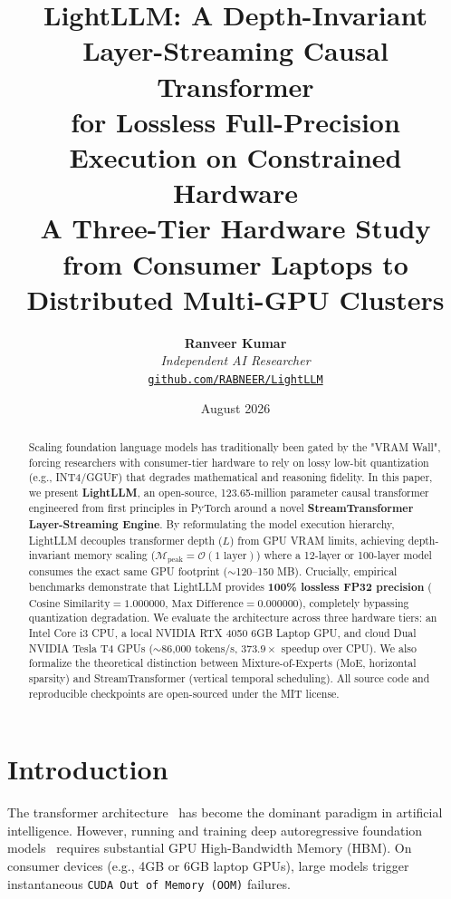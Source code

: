 \documentclass[10pt,twocolumn,a4paper]{article}
\title{%
    \vspace{-1.0cm}
    \textbf{\Large LightLLM: A Depth-Invariant Layer-Streaming Causal Transformer\\
    for Lossless Full-Precision Execution on Constrained Hardware}\\[4pt]
    \large A Three-Tier Hardware Study from Consumer Laptops to Distributed Multi-GPU Clusters
}
\author{%
    \textbf{Ranveer Kumar}\\[2pt]
    \textit{Independent AI Researcher}\\
    \href{https://github.com/RABNEER/LightLLM}{\texttt{github.com/RABNEER/LightLLM}}
}
\date{August 2026}
\begin{document}
\maketitle

\begin{abstract}
\noindent Scaling foundation language models has traditionally been gated by the "VRAM Wall", forcing researchers with consumer-tier hardware to rely on lossy low-bit quantization (e.g., INT4/GGUF) that degrades mathematical and reasoning fidelity. In this paper, we present \textbf{LightLLM}, an open-source, 123.65-million parameter causal transformer engineered from first principles in PyTorch around a novel \textbf{StreamTransformer Layer-Streaming Engine}. By reformulating the model execution hierarchy, LightLLM decouples transformer depth ($L$) from GPU VRAM limits, achieving depth-invariant memory scaling ($\mathcal{M}_{\text{peak}} = \mathcal{O}(1\text{ layer})$) where a 12-layer or 100-layer model consumes the exact same GPU footprint ($\sim$120--150 MB). Crucially, empirical benchmarks demonstrate that LightLLM provides \textbf{100\% lossless FP32 precision} ($\text{Cosine Similarity} = 1.000000$, $\text{Max Difference} = 0.000000$), completely bypassing quantization degradation. We evaluate the architecture across three hardware tiers: an Intel Core i3 CPU, a local NVIDIA RTX 4050 6GB Laptop GPU, and cloud Dual NVIDIA Tesla T4 GPUs ($\sim$86,000 tokens/s, $373.9\times$ speedup over CPU). We also formalize the theoretical distinction between Mixture-of-Experts (MoE, horizontal sparsity) and StreamTransformer (vertical temporal scheduling). All source code and reproducible checkpoints are open-sourced under the MIT license.
\end{abstract}

\section{Introduction}
\label{sec:intro}

The transformer architecture~\citep{vaswani2017attention} has become the dominant paradigm in artificial intelligence. However, running and training deep autoregressive foundation models~\citep{radford2019gpt2,brown2020gpt3} requires substantial GPU High-Bandwidth Memory (HBM). On consumer devices (e.g., 4GB or 6GB laptop GPUs), large models trigger instantaneous \texttt{CUDA Out of Memory (OOM)} failures.
\end{document}
